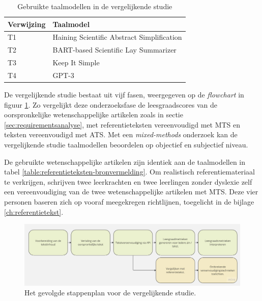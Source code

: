 \begin{center}
	\begin{table}[H]
		\begin{tabular}{ | m{4cm} | m{11cm} | } 
			\hline
			\textbf{Verwijzing} & \textbf{Taalmodel} \\
			\hline
			T1 & Haining Scientific Abstract Simplification \\
			\hline
			T2 & BART-based Scientific Lay Summarizer \\
			\hline
			T3 & Keep It Simple\\
			\hline
			T4 & GPT-3 \\
			\hline
		\end{tabular}
		\caption{Gebruikte taalmodellen in de vergelijkende studie}
		\label{table:vergelijkende-studie-taalmodellen}
	\end{table}
\end{center}

De vergelijkende studie bestaat uit vijf fasen, weergegeven op de \textit{flowchart} in figuur \ref{img:flowchart-vergelijkende-studie-metrics}. Zo vergelijkt deze onderzoeksfase de leesgraadscores van de oorspronkelijke wetenschappelijke artikelen zoals in sectie \ref{sec:requirementsanalyse}, met referentieteksten vereenvoudigd met MTS en teksten vereenvoudigd met ATS. Met een \textit{mixed-methods} onderzoek kan de vergelijkende studie taalmodellen beoordelen op objectief en subjectief niveau. 

De gebruikte wetenschappelijke artikelen zijn identiek aan de taalmodellen in tabel \ref{table:referentieteksten-bronvermelding}. Om realistisch referentiemateriaal te verkrijgen, schrijven twee leerkrachten en twee leerlingen zonder dyslexie zelf een vereenvoudiging van de twee wetenschappelijke artikelen met MTS. Deze vier personen baseren zich op vooraf meegekregen richtlijnen, toegelicht in de bijlage \ref{ch:referentietekst}. 

\begin{figure}
\includegraphics[width=\linewidth]{img/flowchart-vergelijkende-studie.jpg}
\caption{Het gevolgde stappenplan voor de vergelijkende studie.}
\label{img:flowchart-vergelijkende-studie-metrics}
\end{figure}

